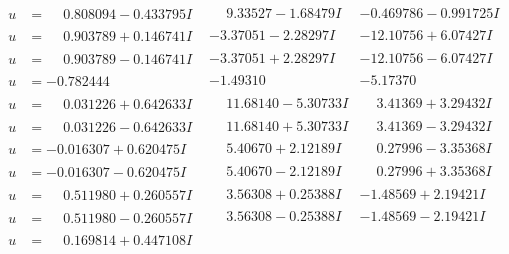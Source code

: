 \documentclass[1p]{elsarticle_modified}
\theoremstyle{definition}
\begin{document}
$$\begin{array}{c|c|c}
\begin{aligned}
u &= \phantom{-}0.808094 - 0.433795 I\end{aligned}
 & \phantom{-}9.33527 - 1.68479 I & -0.469786 - 0.991725 I \\ \hline\begin{aligned}
u &= \phantom{-}0.903789 + 0.146741 I\end{aligned}
 & -3.37051 - 2.28297 I & -12.10756 + 6.07427 I \\ \hline\begin{aligned}
u &= \phantom{-}0.903789 - 0.146741 I\end{aligned}
 & -3.37051 + 2.28297 I & -12.10756 - 6.07427 I \\ \hline\begin{aligned}
u &= -0.782444\phantom{ +0.000000I}\end{aligned}
 & -1.49310\phantom{ +0.000000I} & -5.17370\phantom{ +0.000000I} \\ \hline\begin{aligned}
u &= \phantom{-}0.031226 + 0.642633 I\end{aligned}
 & \phantom{-}11.68140 - 5.30733 I & \phantom{-}3.41369 + 3.29432 I \\ \hline\begin{aligned}
u &= \phantom{-}0.031226 - 0.642633 I\end{aligned}
 & \phantom{-}11.68140 + 5.30733 I & \phantom{-}3.41369 - 3.29432 I \\ \hline\begin{aligned}
u &= -0.016307 + 0.620475 I\end{aligned}
 & \phantom{-}5.40670 + 2.12189 I & \phantom{-}0.27996 - 3.35368 I \\ \hline\begin{aligned}
u &= -0.016307 - 0.620475 I\end{aligned}
 & \phantom{-}5.40670 - 2.12189 I & \phantom{-}0.27996 + 3.35368 I \\ \hline\begin{aligned}
u &= \phantom{-}0.511980 + 0.260557 I\end{aligned}
 & \phantom{-}3.56308 + 0.25388 I & -1.48569 + 2.19421 I \\ \hline\begin{aligned}
u &= \phantom{-}0.511980 - 0.260557 I\end{aligned}
 & \phantom{-}3.56308 - 0.25388 I & -1.48569 - 2.19421 I \\ \hline\begin{aligned}
u &= \phantom{-}0.169814 + 0.447108 I\end{aligned}

\end{array}$$
\end{document}

